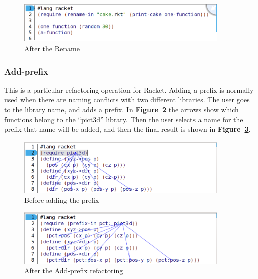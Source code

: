 \begin{figure}[htbp]
	\centering
	\includegraphics[width=0.9\textwidth]{img/renameV2-2.png}
	\caption{After the Rename}
	\label{fig:renameAfter}
\end{figure}

\subsubsection{Add-prefix}

This is a particular refactoring operation for Racket. Adding a prefix is normally used when there are naming conflicts with two different libraries. The user goes to the library name, and adds a prefix.
In {\bf Figure~\ref{fig:addPrefixBefore}} the arrows show which functions belong to the ``pict3d'' library.
Then the user selects a name for the prefix that name will be added, and then the final result is shown in {\bf Figure~\ref{fig:addPrefixAfter}}.

\begin{figure}[hb!]
	\centering
	\includegraphics[width=0.9\textwidth]{img/add-prefixV2-1.png}
	\caption{Before adding the prefix}
	\label{fig:addPrefixBefore}
\end{figure}


\begin{figure}[hb!]
	\centering
	\includegraphics[width=0.9\textwidth]{img/add-prefixV2-3.png}
	\caption{After the Add-prefix refactoring}
	\label{fig:addPrefixAfter}
\end{figure}